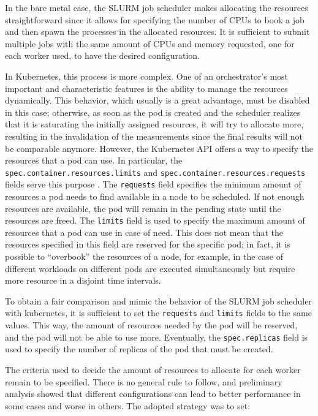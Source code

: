 In the bare metal case, the SLURM job scheduler makes allocating the resources
straightforward since it allows for specifying the number of CPUs to book a job
and then spawn the processes in the allocated resources. It is sufficient to
submit multiple jobs with the same amount of CPUs and memory requested, one for
each worker used, to have the desired configuration.

In Kubernetes, this process is more complex. One of an orchestrator's most
important and characteristic features is the ability to manage the resources
dynamically. This behavior, which usually is a great advantage, must be disabled
in this case; otherwise, as soon as the pod is created and the scheduler
realizes that it is saturating the initially assigned resources, it will try to
allocate more, resulting in the invalidation of the measurements since the final
results will not be comparable anymore. However, the Kubernetes API offers a way
to specify the resources that a pod can use. In particular, the
\texttt{spec.container.resources.limits} and
\texttt{spec.container.resources.requests} fields serve this purpose
\cite{kdoc-resources}. The \texttt{requests} field specifies the minimum amount
of resources a pod needs to find available in a node to be scheduled. If not
enough resources are available, the pod will remain in the pending state until
the resources are freed. The \texttt{limits} field is used to specify the
maximum amount of resources that a pod can use in case of need. This does not
mean that the resources specified in this field are reserved for the specific
pod; in fact, it is possible to ``overbook'' the resources of a node, for
example, in the case of different workloads on different pods are executed
simultaneously but require more resource in a disjoint time intervals.

To obtain a fair comparison and mimic the behavior of the SLURM job scheduler
with kubernetes, it is sufficient to set the \texttt{requests} and
\texttt{limits} fields to the same values. This way, the amount of resources
needed by the pod will be reserved, and the pod will not be able to use more.
Eventually, the \texttt{spec.replicas} field is used to specify the number of
replicas of the pod that must be created.

The criteria used to decide the amount of resources to allocate for each worker
remain to be specified. There is no general rule to follow, and preliminary
analysis showed that different configurations can lead to better performance in
some cases and worse in others. The adopted strategy was to set:

